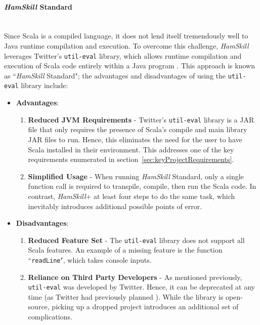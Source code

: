 \documentclass{report}
\newcommand{\myparagraph}[1]{\paragraph{#1}\mbox{}\\}
\begin{document}
\myparagraph{\textit{HamSkill} Standard}

Since Scala is a compiled language, it does not lend itself tremendously well to Java runtime compilation and execution.  To overcome this challenge, \textit{HamSkill} leverages Twitter's \texttt{util-eval} library, which allows runtime compilation and execution of Scala code entirely within a Java program \cite{githubTwitterEvalUtil}.  This approach is known as ``\textit{HamSkill} Standard"; the advantages and disadvantages of using the \texttt{util-eval} library include:

\begin{itemize}

\item \textbf{Advantages}:

\begin{enumerate}

\item \textbf{Reduced JVM Requirements} - Twitter's \texttt{util-eval} library is a JAR file that only requires the presence of Scala's compile and main library JAR files to run.  Hence, this eliminates the need for the user to have Scala installed in their environment.  This addresses one of the key requirements enumerated in section~\ref{sec:keyProjectRequirements}.

\item \textbf{Simplified Usage} - When running \textit{HamSkill} Standard, only a single function call is required to transpile, compile, then run the Scala code.  In contrast, \textit{HamSkill}+ at least four steps to do the same task, which inevitably introduces additional possible points of error.

\end{enumerate}

\item \textbf{Disadvantages}:

\begin{enumerate}

\item \textbf{Reduced Feature Set} - The \texttt{util-eval} library does not support all Scala features.  An example of a missing feature is the function ``\texttt{readLine}", which takes console inputs.

\item \textbf{Reliance on Third Party Developers} - As mentioned previously, \texttt{util-eval} was developed by Twitter.  Hence, it can be deprecated at any time (as Twitter had previously planned \cite{deprecateUtilEval}).  While the library is open-source, picking up a dropped project introduces an additional set of complications.

\end{enumerate}

\end{itemize}
\end{document}
